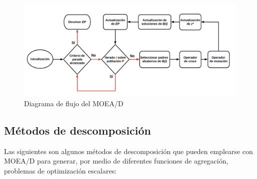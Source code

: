 \begin{figure}
	\centering
	\includegraphics[width=1.1\textwidth]{Images/moead_flowchart}
	\caption{Diagrama de flujo del MOEA/D}
	\label{fig:moeadflow}
\end{figure}

\subsection{Métodos de descomposición}\label{sec:decompmethods}

Las siguientes son algunos métodos de descomposición que pueden emplearse con MOEA/D para generar, por medio de diferentes funciones de agregación, problemas de optimización escalares:

